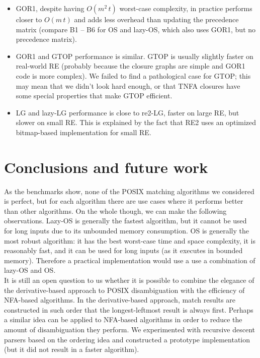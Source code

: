 \documentclass[AMA,STIX1COL]{WileyNJD-v2}
\begin{document}
\begin{itemize}[itemsep=0.2em, topsep=0.5em]
\item GOR1, despite having $O(m^2 \, t)$ worst-case complexity,
    in practice performs closer to $O(m \, t)$
    and adds less overhead than updating the precedence matrix
    (compare B1 -- B6 for OS and lazy-OS, which also uses GOR1, but no precedence matrix).

\item GOR1 and GTOP performance is similar.
    GTOP is usually slightly faster on real-world RE (probably because the closure graphs are simple and GOR1 code is more complex).
    We failed to find a pathological case for GTOP;
    this may mean that we didn't look hard enough,
    or that TNFA closures have some special properties that make GTOP efficient.

\item LG and lazy-LG performance is close to re2-LG, faster on large RE, but slower on small RE.
    This is explained by the fact that RE2 uses an optimized bitmap-based implementation for small RE.
\end{itemize}

\FloatBarrier


\section{Conclusions and future work}\label{section_conclusions}

As the benchmarks show, none of the POSIX matching algorithms we considered is perfect,
but for each algorithm there are use cases where it performs better than other algorithms.
On the whole though, we can make the following observations.
Lazy-OS is generally the fastest algorithm, but it cannot be used for long inputs due to its unbounded memory consumption.
OS is generally the most robust algorithm: it has the best worst-case time and space complexity,
it is reasonably fast, and it can be used for long inputs (as it executes in bounded memory).
Therefore a practical implementation would use a use a combination of lazy-OS and OS.
\\

It is still an open question to us
whether it is possible to combine the elegance of the derivative-based approach to POSIX disambiguation
with the efficiency of NFA-based algorithms.
%
In the derivative-based approach, match results are constructed in such order that the longest-leftmost result is always first.
Perhaps a similar idea can be applied to NFA-based algorithms in order to reduce the amount of disambiguation they perform.
We experimented with recursive descent parsers based on the ordering idea
and constructed a prototype implementation (but it did not result in a faster algorithm).
\\
\end{document}

